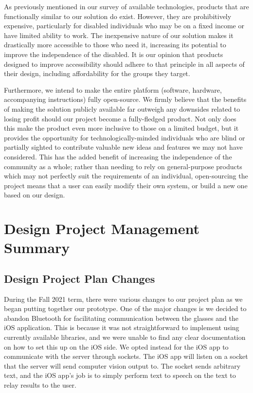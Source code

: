 \documentclass[a4paper,11pt]{article}
\begin{document}
As previously mentioned in our survey of available technologies, products that are functionally similar to our solution do exist. However, they are prohibitively expensive, particularly for disabled individuals who may be on a fixed income or have limited ability to work. The inexpensive nature of our solution makes it drastically more accessible to those who need it, increasing its potential to improve the independence of the disabled. It is our opinion that products designed to improve accessibility should adhere to that principle in all aspects of their design, including affordability for the groups they target.

Furthermore, we intend to make the entire platform (software, hardware, accompanying instructions) fully open-source. We firmly believe that the benefits of making the solution publicly available far outweigh any downsides related to losing profit should our project become a fully-fledged product. Not only does this make the product even more inclusive to those on a limited budget, but it provides the opportunity for technologically-minded individuals who are blind or partially sighted to contribute valuable new ideas and features we may not have considered. This has the added benefit of increasing the independence of the community as a whole; rather than needing to rely on general-purpose products which may not perfectly suit the requirements of an individual, open-sourcing the project means that a user can easily modify their own system, or build a new one based on our design.

\section{Design Project Management Summary}
\subsection{Design Project Plan Changes}
During the Fall 2021 term, there were various changes to our project plan as we began putting together our prototype. One of the major changes is we decided to abandon Bluetooth for facilitating communication between the glasses and the iOS application. This is because it was not straightforward to implement using currently available libraries, and we were unable to find any clear documentation on how to set this up on the iOS side. We opted instead for the iOS app to communicate with the server through sockets. The iOS app will listen on a socket that the server will send computer vision output to. The socket sends arbitrary text, and the iOS app's job is to simply perform text to speech on the text to relay results to the user.
\end{document}
